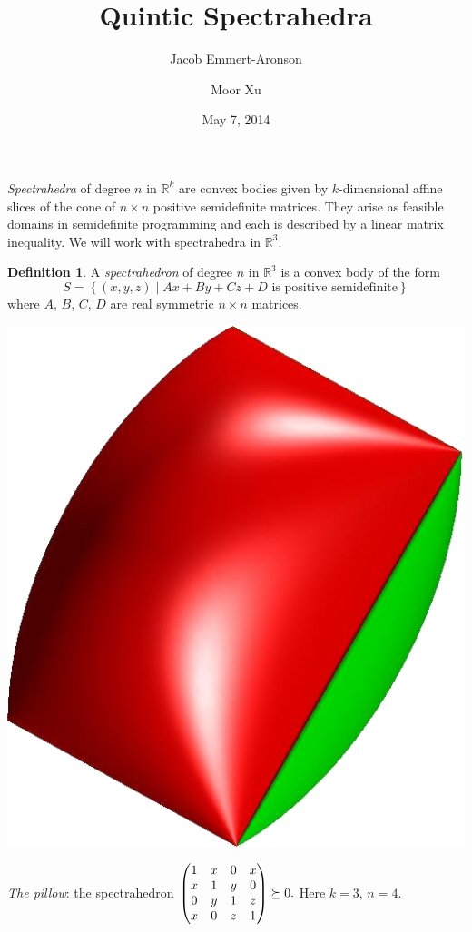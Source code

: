 \documentclass[12pt]{amsart}
\title{Quintic Spectrahedra}
\author{Jacob Emmert-Aronson}
\author{Moor Xu}
\date{May 7, 2014}
\theoremstyle{plain}
\theoremstyle{definition}
\newtheorem{definition}[theorem]{Definition}
\begin{document}
 
\maketitle

\emph{Spectrahedra} of degree $n$ in $\mathbb{R}^k$ are convex bodies
given by $k$-dimensional affine slices of the cone of $n \times n$
positive semidefinite matrices.  They arise as feasible domains in
semidefinite programming and each is described by a linear matrix
inequality. We will work with spectrahedra in $\mathbb R^3$.

\begin{definition} 
	A \emph{spectrahedron} of degree $n$ in $\mathbb R^3$ is a convex body
	of the form 
	\[ 
		S = \left\{
		(x,y,z) \mid Ax + By + Cz + D \text{ is positive semidefinite} \right\}
	\] 
	where $A$, $B$, $C$, $D$ are real symmetric $n\times n$ matrices.
\end{definition} 

\bigskip

\begin{center}
\includegraphics[scale=.15]{pillow.jpg}
\bigskip

{\small
\emph{The pillow}: the spectrahedron
$
\begin{pmatrix}
  1&x&0&x\\
  x&1&y&0\\
  0&y&1&z\\
  x&0&z&1
\end{pmatrix}
\succeq 0\text.$  Here $k=3,\, n=4$.}
\end{center}
\bigskip
\end{document}
